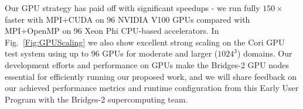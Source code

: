 \documentclass[onecolumn, 12pt]{article}
\begin{document}
Our GPU strategy has paid off with significant speedups - we run fully $150\times$ faster with MPI+CUDA on 96 NVIDIA V100 GPUs compared with MPI+OpenMP on 96 Xeon Phi CPU-based accelerators.
In Fig.~\ref{Fig:GPUScaling} we also show excellent strong scaling on the Cori GPU test system using up to 96 GPUs for moderate and larger ($1024^3$) domains. Our development efforts and performance on GPUs make the Bridges-2 GPU nodes essential for efficiently running our proposed work, and we will share feedback on our achieved performance metrics and runtime configuration from this Early User Program with the Bridges-2 supercomputing team.



%
%
\end{document}
